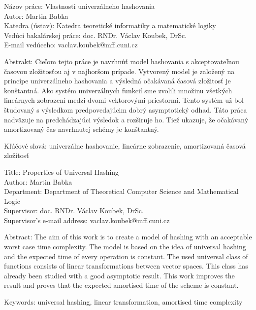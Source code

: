 \noindent
{}
\begin{flushleft}
Názov práce: Vlastnosti univerzálneho hashovania\\
Autor: Martin Babka\\
Katedra (ústav): Katedra teoretické informatiky a matematické logiky\\
Vedúci bakalárskej práce: doc. RNDr. Václav Koubek, DrSc.\\
E-mail vedúceho: vaclav.koubek@mff.cuni.cz\\

\end{flushleft}
\noindent Abstrakt: Cieľom tejto práce je navrhnúť model hashovania s akceptovateľnou ča\-so\-vou zložitosťou aj v najhoršom prípade. Vytvorený model je založený na princípe univerzálneho hashovania a výsledná očakávaná časová zložitosť je konštantná. Ako systém univerzálnych funkcií sme zvolili množinu všetkých lineárnych zobrazení medzi dvomi vektorovými priestormi. Tento systém už bol študovaný s výsledkom predpovedajúcim dobrý asymptotický odhad. Táto práca nadväzuje na predchádzajúci výsledok a rozširuje ho. Tiež ukazuje, že očakávaný amortizovaný čas navrhnutej schémy je konštantný.
\begin{flushleft}
\noindent Kľúčové slová: univerzálne hashovanie, lineárne zobrazenie, amortizovaná časová zložitosť

\vspace{10mm}

\noindent
Title: Properties of Universal Hashing\\
Author: Martin Babka\\
Department: Department of Theoretical Computer Science and Mathematical Logic\\
Supervisor: doc. RNDr. Václav Koubek, DrSc.\\
Supervisor's e-mail address: vaclav.koubek@mff.cuni.cz\\

\end{flushleft}
\noindent Abstract: The aim of this work is to create a model of hashing with an acceptable worst case time complexity. The model is based on the idea of universal hashing and the expected time of every operation is constant. The used universal class of functions consists of linear transformations between vector spaces. This class has already been studied with a good asymptotic result. This work improves the result and proves that the expected amortised time of the scheme is constant.
\begin{flushleft}
\noindent Keywords: universal hashing, linear transformation, amortised time complexity

\end{flushleft}
\newpage
